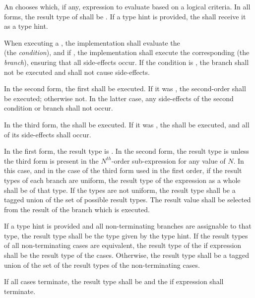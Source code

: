\specsubsubitem
An  chooses which, if any, expression to evaluate
based on a logical criteria. In all forms, the result type of
 shall be . If a type hint is provided,
the  shall receive it as a type hint.

\specsubsubitem
When executing a , the implementation shall
evaluate the \\  (the \textit{condition}), and if
, the implementation shall execute the corresponding
 (the \textit{branch}), ensuring that all side-effects
occur. If the condition is , the branch shall not be executed
and shall not cause side-effects.

\specsubsubitem
In the second form, the first  shall be
executed. If it was , the second-order
 shall be executed; otherwise not. In the latter
case, any side-effects of the second condition or branch shall not occur.

\specsubsubitem
In the third form, the  shall be executed. If
it was , the  shall be executed, and all
of its side-effects shall occur.

\specsubsubitem
In the first form, the result type is . In the second form, the
result type is  unless the third form is present in the
$N^{th}$-order sub-expression for any value of $N$. In this case, and in the
case of the third form used in the first order, if the result types of each
branch are uniform, the result type of the expression as a whole shall be of
that type. If the types are not uniform, the result type shall be a tagged
union of the set of possible result types. The result value shall be selected
from the result of the branch which is executed.

\specsubsubitem
If a type hint is provided and all non-terminating branches are assignable to
that type, the result type shall be the type given by the type hint. If the
result types of all non-terminating cases are equivalent, the result type of
the if expression shall be the result type of the cases. Otherwise, the
result type shall be a tagged union of the set of the result types of the
non-terminating cases.

If all cases terminate, the result type shall be  and the if
expression shall terminate.

